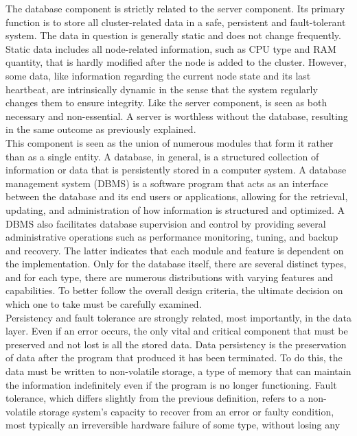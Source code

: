 The database component is strictly related to the server component. Its primary
function is to store all cluster-related data in a safe, persistent and fault-tolerant
system. The data in question is generally static and does not change frequently.
Static data includes all node-related information, such as CPU type and RAM
quantity, that is hardly modified after the node is added to the cluster.
However, some data, like information regarding the current node state and its
last heartbeat, are intrinsically dynamic in the sense that the system regularly
changes them to ensure integrity. Like the server component, is seen as both necessary
and non-essential. A server is worthless without the database, resulting in the same
outcome as previously explained. \\ %
This component is seen as the union of numerous modules that form it rather than
as a single entity. A database, in general, is a structured collection of
information or data that is persistently stored in a computer system. A database
management system (DBMS) is a software program that acts as an interface between
the database and its end users or applications, allowing for the retrieval, updating,
and administration of how information is structured and optimized. A DBMS also facilitates
database supervision and control by providing several administrative operations such
as performance monitoring, tuning, and backup and recovery\cite{database}. The latter
indicates that each module and feature is dependent on the implementation. Only
for the database itself, there are several distinct types, and for each type, there
are numerous distributions with varying features and capabilities. To better
follow the overall design criteria, the ultimate decision on which one to take must
be carefully examined. \\ %
Persistency and fault tolerance are strongly related, most importantly, in the data
layer. Even if an error occurs, the only vital and critical component that must be
preserved and not lost is all the stored data. Data persistency is the
preservation of data after the program that produced it has been terminated. To do
this, the data must be written to non-volatile storage, a type of memory that can
maintain the information indefinitely even if the program is no longer functioning\cite{persistency}.
Fault tolerance, which differs slightly from the previous definition, refers to a
non-volatile storage system's capacity to recover from an error or faulty condition,
most typically an irreversible hardware failure of some type, without losing any
